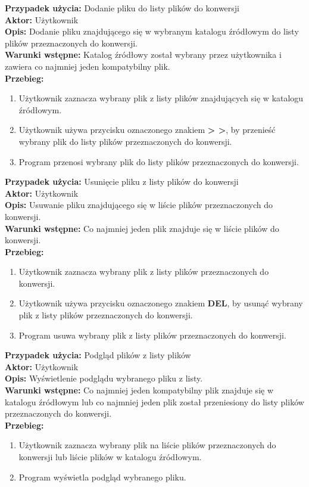 \noindent \textbf{Przypadek użycia:} Dodanie pliku do listy plików do konwersji\\
\textbf{Aktor:} Użytkownik\\
\textbf{Opis:} Dodanie pliku znajdującego się w wybranym katalogu źródłowym do listy plików przeznaczonych do konwersji.\\
\textbf{Warunki wstępne:} Katalog źródłowy został wybrany przez użytkownika i zawiera co najmniej jeden kompatybilny plik.\\
\textbf{Przebieg:}
\begin{enumerate}
\item Użytkownik zaznacza wybrany plik z listy plików znajdujących się w katalogu źródłowym.
\item Użytkownik używa przycisku oznaczonego znakiem \textbf{> >}, by przenieść wybrany plik do listy plików przeznaczonych do konwersji.
\item Program przenosi wybrany plik do listy plików przeznaczonych do konwersji.
\end{enumerate}


\noindent \textbf{Przypadek użycia:} Usunięcie pliku z listy plików do konwersji\\
\textbf{Aktor:} Użytkownik\\
\textbf{Opis:} Usuwanie pliku znajdującego się w liście plików przeznaczonych do konwersji.\\
\textbf{Warunki wstępne:} Co najmniej jeden plik znajduje się w liście plików do konwersji.\\
\textbf{Przebieg:}
\begin{enumerate}
	\item Użytkownik zaznacza wybrany plik z listy plików przeznaczonych do konwersji.
	\item Użytkownik używa przycisku oznaczonego znakiem \textbf{DEL}, by usunąć wybrany plik z listy plików przeznaczonych do konwersji.
	\item Program usuwa wybrany plik z listy plików przeznaczonych do konwersji.
\end{enumerate}


\noindent \textbf{Przypadek użycia:} Podgląd plików z listy plików\\
\textbf{Aktor:} Użytkownik\\
\textbf{Opis:} Wyświetlenie podglądu wybranego pliku z listy.\\
\textbf{Warunki wstępne:} Co najmniej jeden kompatybilny plik znajduje się w katalogu źródłowym lub co najmniej jeden plik został przeniesiony do listy plików przeznaczonych do konwersji.\\
\textbf{Przebieg:}
\begin{enumerate}
	\item Użytkownik zaznacza wybrany plik na liście plików przeznaczonych do konwersji lub liście plików w katalogu źródłowym.
	\item Program wyświetla podgląd wybranego pliku.
\end{enumerate}



